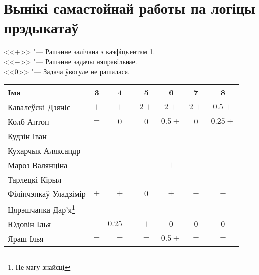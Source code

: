 


	\section{Вынікі самастойнай работы па логіцы прэдыкатаў}
    \noindent <<$+$>> "--- Рашэнне залічана з каэфіцыентам 1. \\
    <<$-$>> "--- Рашэнне задачы няправільнае. \\
    <<$0$>> "--- Задача ўвогуле не рашалася.
\begin{table}[H]
    \begin{minipage}{\textwidth}
    	\begin{tabular}{|l|c|c|c|c|c|c|}
		\hline
		Імя                   &   3   &    4    &   5  &    6   &   7  &    8    \\ \hline
		Кавалеўскі Дзяніс     &  $+$  &   $+$   & $2+$ &  $2+$  & $2+$ &  $0.5+$ \\ \hline
		Колб Антон            &  $-$  &   $0$   &  $0$ & $0.5+$ &  $0$ & $0.25+$ \\ \hline
		Кудзін Іван           &       &         &      &        &      &         \\ \hline
		Кухарчык Аляксандр    &       &         &      &        &      &         \\ \hline
		Мароз Валянціна       &  $-$  &   $-$   &  $-$ &   $+$  &  $-$ &   $-$   \\ \hline
		Тарлецкі Кірыл        &       &         &      &        &      &         \\ \hline
		Філіпчэнкаў Уладзімір &  $+$  &   $+$   &  $0$ &   $+$  &  $+$ &   $+$   \\ \hline
		Цярэшчанка Дар'я\footnote{Не магу знайсці} &&& &        &      &         \\ \hline
		Юдовін Ілья           &  $-$  & $0.25+$ &  $+$ &   $0$  &  $0$ &   $0$   \\ \hline
		Яраш Ілья             &  $-$  &   $-$   &  $-$ & $0.5+$ &  $-$ &   $-$   \\ \hline
	   \end{tabular}
    \end{minipage}
\end{table}

